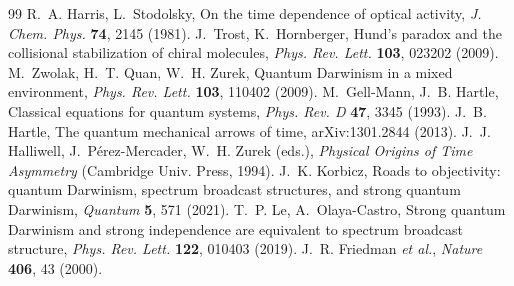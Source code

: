 \documentclass[11pt]{article}
\begin{document}
\begin{thebibliography}{99}
 R.~A. Harris, L.~Stodolsky, On the time dependence of optical activity, \emph{J. Chem. Phys.} \textbf{74}, 2145 (1981).
 J.~Trost, K.~Hornberger, Hund's paradox and the collisional stabilization of chiral molecules, \emph{Phys. Rev. Lett.} \textbf{103}, 023202 (2009).
 M.~Zwolak, H.~T. Quan, W.~H. Zurek, Quantum Darwinism in a mixed environment, \emph{Phys. Rev. Lett.} \textbf{103}, 110402 (2009).
 M.~Gell-Mann, J.~B. Hartle, Classical equations for quantum systems, \emph{Phys. Rev. D} \textbf{47}, 3345 (1993).
 J.~B. Hartle, The quantum mechanical arrows of time, arXiv:1301.2844 (2013).
 J.~J. Halliwell, J.~P\'erez-Mercader, W.~H. Zurek (eds.), \emph{Physical Origins of Time Asymmetry} (Cambridge Univ. Press, 1994).
 J.~K. Korbicz, Roads to objectivity: quantum Darwinism, spectrum broadcast structures, and strong quantum Darwinism, \emph{Quantum} \textbf{5}, 571 (2021).
 T.~P. Le, A.~Olaya-Castro, Strong quantum Darwinism and strong independence are equivalent to spectrum broadcast structure, \emph{Phys. Rev. Lett.} \textbf{122}, 010403 (2019).
 J.~R. Friedman \emph{et al.}, \emph{Nature} \textbf{406}, 43 (2000).
\end{thebibliography}
\end{document}
